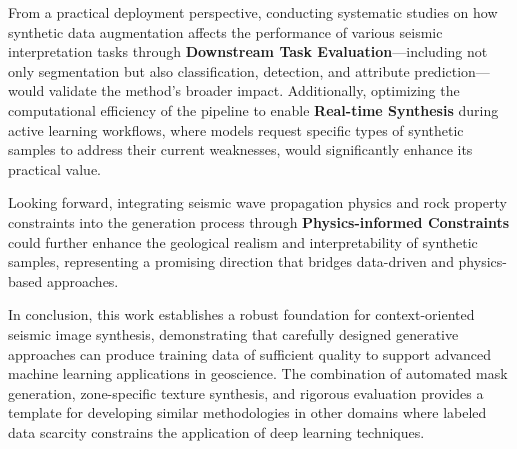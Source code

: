 \documentclass{ieeeaccess}
\begin{document}
From a practical deployment perspective, conducting systematic studies on how synthetic data augmentation affects the performance of various seismic interpretation tasks through \textbf{Downstream Task Evaluation}—including not only segmentation but also classification, detection, and attribute prediction—would validate the method's broader impact. Additionally, optimizing the computational efficiency of the pipeline to enable \textbf{Real-time Synthesis} during active learning workflows, where models request specific types of synthetic samples to address their current weaknesses, would significantly enhance its practical value.

Looking forward, integrating seismic wave propagation physics and rock property constraints into the generation process through \textbf{Physics-informed Constraints} could further enhance the geological realism and interpretability of synthetic samples, representing a promising direction that bridges data-driven and physics-based approaches.

In conclusion, this work establishes a robust foundation for context-oriented seismic image synthesis, demonstrating that carefully designed generative approaches can produce training data of sufficient quality to support advanced machine learning applications in geoscience. The combination of automated mask generation, zone-specific texture synthesis, and rigorous evaluation provides a template for developing similar methodologies in other domains where labeled data scarcity constrains the application of deep learning techniques.
\end{document}
